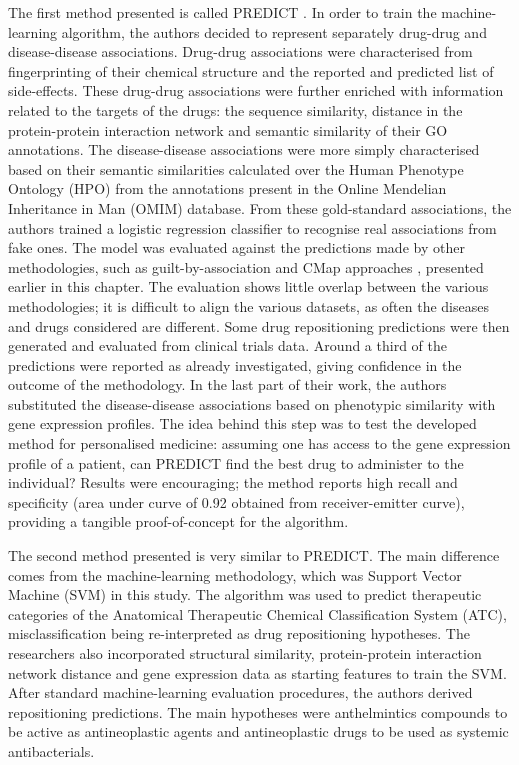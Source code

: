 The first method presented is called PREDICT \citep{gottlieb2011predict}. In order to train the machine-learning algorithm, the authors decided to represent separately drug-drug and disease-disease associations. Drug-drug associations were characterised from fingerprinting of their chemical structure and the reported and predicted list of side-effects. These drug-drug associations were further enriched with information related to the targets of the drugs: the sequence similarity, distance in the protein-protein interaction network and semantic similarity of their GO annotations. The disease-disease associations were more simply characterised based on their semantic similarities calculated over the Human Phenotype Ontology (HPO) from the annotations present in the Online Mendelian Inheritance in Man (OMIM) database. From these gold-standard associations, the authors trained a logistic regression classifier to recognise real associations from fake ones. The model was evaluated against the predictions made by other methodologies, such as guilt-by-association and CMap approaches \citep{lamb2006connectivity}, presented earlier in this chapter. The evaluation shows little overlap between the various methodologies; it is difficult to align the various datasets, as often the diseases and drugs considered are different. Some drug repositioning predictions were then generated and evaluated from clinical trials data. Around a third of the predictions were reported as already investigated, giving confidence in the outcome of the methodology. In the last part of their work, the authors substituted the disease-disease associations based on phenotypic similarity with gene expression profiles. The idea behind this step was to test the developed method for personalised medicine: assuming one has access to the gene expression profile of a patient, can PREDICT find the best drug to administer to the individual? Results were encouraging; the method reports high recall and specificity (area under curve of 0.92 obtained from receiver-emitter curve), providing a tangible proof-of-concept for the algorithm.

The second method presented \citep{napolitano2013drug} is very similar to PREDICT. The main difference comes from the machine-learning methodology, which was Support Vector Machine (SVM) in this study. The algorithm was used to predict therapeutic categories of the Anatomical Therapeutic Chemical Classification System (ATC), misclassification being re-interpreted as drug repositioning hypotheses. The researchers also incorporated structural similarity, protein-protein interaction network distance and gene expression data as starting features to train the SVM. After standard machine-learning evaluation procedures, the authors derived repositioning predictions. The main hypotheses were anthelmintics compounds to be active as antineoplastic agents and antineoplastic drugs to be used as systemic antibacterials.

